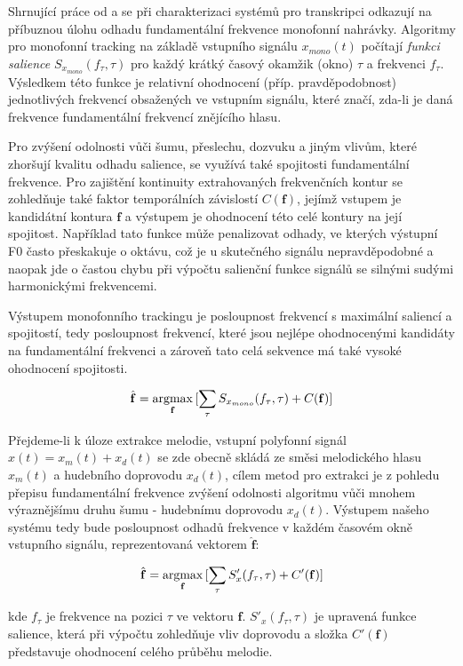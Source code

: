 Shrnující práce od \cite{Poliner2007} a \cite{Salamon2014} se při charakterizaci systémů pro transkripci odkazují na příbuznou úlohu odhadu fundamentální frekvence monofonní nahrávky. Algoritmy pro monofonní tracking na základě vstupního signálu $x_{mono}(t)$ počítají \emph{funkci salience} $S_{x_{mono}}(f_\tau, \tau)$ pro každý krátký časový okamžik (okno) $\tau$ a frekvenci $f_\tau$. Výsledkem této funkce je relativní ohodnocení (příp. pravděpodobnost) jednotlivých frekvencí obsažených ve vstupním signálu, které značí, zda-li je daná frekvence fundamentální frekvencí znějícího hlasu. 

Pro zvýšení odolnosti vůči šumu, přeslechu, dozvuku a jiným vlivům, které zhoršují kvalitu odhadu salience, se využívá také spojitosti fundamentální frekvence. Pro zajištění kontinuity extrahovaných frekvenčních kontur se zohledňuje také faktor temporálních závislostí $C(\mathbf{f})$, jejímž vstupem je kandidátní kontura $\mathbf{f}$ a výstupem je ohodnocení této celé kontury na její spojitost. Například tato funkce může penalizovat odhady, ve kterých výstupní F0 často přeskakuje o oktávu, což je u skutečného signálu nepravděpodobné a naopak jde o častou chybu při výpočtu salienční funkce signálů se silnými sudými harmonickými frekvencemi.

Výstupem monofonního trackingu je posloupnost frekvencí s maximální saliencí a spojitostí, tedy posloupnost frekvencí, které jsou nejlépe ohodnocenými kandidáty na fundamentální frekvenci a zároveň tato celá sekvence má také vysoké ohodnocení spojitosti.

    $$\hat{\mathbf{f}} = \argmax_{\mathbf{f}}{[\sum_{\tau}{S_{x_{mono}}(f_\tau, \tau)} + C(\mathbf{f})]}$$

Přejdeme-li k úloze extrakce melodie, vstupní polyfonní signál $x(t) = x_m(t) + x_d(t)$ se zde obecně skládá ze směsi melodického hlasu $x_m(t)$ a hudebního doprovodu $x_d(t)$, cílem metod pro extrakci je z pohledu přepisu fundamentální frekvence zvýšení odolnosti algoritmu vůči mnohem výraznějšímu druhu šumu - hudebnímu doprovodu $x_d(t)$. Výstupem našeho systému tedy bude posloupnost odhadů frekvence v každém časovém okně vstupního signálu, reprezentovaná vektorem $\hat{\mathbf{f}}$:

    $$\hat{\mathbf{f}} = \argmax_{\mathbf{f}}{[\sum_{\tau}{S'_x(f_\tau, \tau)} + C'(\mathbf{f})]}$$

kde $f_\tau$ je frekvence na pozici $\tau$ ve vektoru $\mathbf{f}$. $S'_x(f_\tau, \tau)$ je upravená funkce salience, která při výpočtu zohledňuje vliv doprovodu a složka $C'(\mathbf{f})$ představuje ohodnocení celého průběhu melodie.

